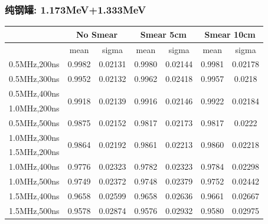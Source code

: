 \begin{frame}
    \frametitle{纯钢罐: 1.173MeV+1.333MeV}

\begin{tabular}{|c|cc|cc|cc|}
\hline
 & \multicolumn{2}{|c|}{No Smear} 
 & \multicolumn{2}{|c|}{Smear 5cm}
 & \multicolumn{2}{|c|}{Smear 10cm}
\\
\hline
 & mean & sigma
 & mean & sigma
 & mean & sigma
\\
\hline
0.5MHz,200ns
 & 0.9982 &  0.02131
 & 0.9980 &  0.02144
 & 0.9981 &  0.02178
\\
\hline
0.5MHz,300ns
 & 0.9952 &  0.02132
 & 0.9962 &  0.02418
 & 0.9957 &  0.0218
\\
\hline
0.5MHz,400ns
& \multirow{2}{*}{0.9918} & \multirow{2}{*}{0.02139}
& \multirow{2}{*}{0.9916} & \multirow{2}{*}{0.02146}
& \multirow{2}{*}{0.9922} & \multirow{2}{*}{0.02184}
\\
\cline{1-1}
1.0MHz,200ns
 &  & 
 &  & 
 &  & 
\\
\hline
0.5MHz,500ns
 & 0.9875 &  0.02152
 & 0.9817 &  0.02173
 & 0.9817 &  0.0222
\\
\hline
1.0MHz,300ns
& \multirow{2}{*}{0.9864} & \multirow{2}{*}{0.02192}
& \multirow{2}{*}{0.9861} & \multirow{2}{*}{0.02213}
& \multirow{2}{*}{0.9860} & \multirow{2}{*}{0.02218}
\\
\cline{1-1}
1.5MHz,200ns
 &  & 
 &  & 
 &  & 
\\
\hline
1.0MHz,400ns
 & 0.9776 &  0.02323
 & 0.9782 &  0.02323
 & 0.9784 &  0.02298
\\
\hline
1.0MHz,500ns
 & 0.9749 &  0.02372
 & 0.9748 &  0.02379
 & 0.9752 &  0.02442
\\
\hline
1.5MHz,400ns
 & 0.9658 &  0.02599
 & 0.9658 &  0.02636
 & 0.9661 &  0.02667
\\
\hline
1.5MHz,500ns
 & 0.9578 &  0.02874
 & 0.9576 &  0.02932
 & 0.9580 &  0.02975
\\
\hline
\end{tabular}

\end{frame}

